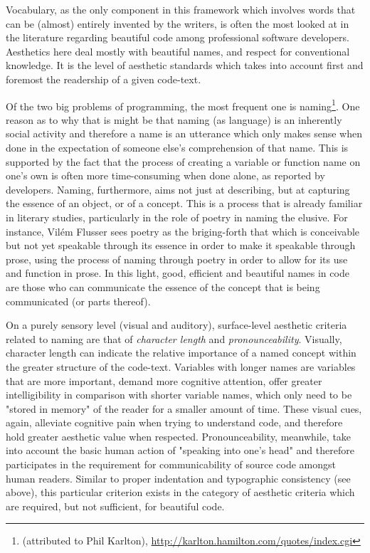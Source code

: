 Vocabulary, as the only component in this framework which involves words that can be (almost) entirely invented by the writers, is often the most looked at in the literature regarding beautiful code among professional software developers. Aesthetics here deal mostly with beautiful names, and respect for conventional knowledge. It is the level of aesthetic standards which takes into account first and foremost the readership of a given code-text.

Of the two big problems of programming, the most frequent one is naming\footnote{(attributed to Phil Karlton), \url{http://karlton.hamilton.com/quotes/index.cgi}}. One reason as to why that is might be that naming (as language) is an inherently social activity \citep{voloshinov_marxism_1986} and therefore a name is an utterance which only makes sense when done in the expectation of someone else's comprehension of that name. This is supported by the fact that the process of creating a variable or function name on one's own is often more time-consuming when done alone, as reported by developers. Naming, furthermore, aims not just at describing, but at capturing the essence of an object, or of a concept. This is a process that is already familiar in literary studies, particularly in the role of poetry in naming the elusive. For instance, Vilém Flusser sees poetry as the briging-forth that which is conceivable but not yet speakable through its essence in order to make it speakable through prose, using the process of naming through poetry in order to allow for its use and function in prose. In this light, good, efficient and beautiful names in code are those who can communicate the essence of the concept that is being communicated (or parts thereof).

On a purely sensory level (visual and auditory), surface-level aesthetic criteria related to naming are that of \emph{character length} and \emph{pronounceability}. Visually, character length can indicate the relative importance of a named concept within the greater structure of the code-text. Variables with longer names are variables that are more important, demand more cognitive attention, offer greater intelligibility in comparison with shorter variable names, which only need to be "stored in memory" of the reader for a smaller amount of time. These visual cues, again, alleviate cognitive pain when trying to understand code, and therefore hold greater aesthetic value when respected. Pronounceability, meanwhile, take into account the basic human action of "speaking into one's head" and therefore participates in the requirement for communicability of source code amongst human readers. Similar to proper indentation and typographic consistency (see above), this particular criterion exists in the category of aesthetic criteria which are required, but not sufficient, for beautiful code.

